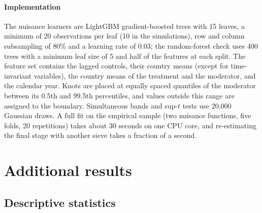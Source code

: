 \documentclass[preprint,12pt,authoryear]{elsarticle}
\begin{document}
\paragraph{Implementation}
The nuisance learners are LightGBM gradient-boosted trees \citep{ke2017lightgbm} with 15 leaves, a minimum of 20 observations per leaf (10 in the simulations), row and column subsampling of 80\% and a learning rate of 0.03; the random-forest check uses 400 trees \citep{breiman2001rf} with a minimum leaf size of 5 and half of the features at each split. The feature set contains the lagged controls, their country means (except for time-invariant variables), the country means of the treatment and the moderator, and the calendar year. Knots are placed at equally spaced quantiles of the moderator between its 0.5th and 99.5th percentiles, and values outside this range are assigned to the boundary. Simultaneous bands and sup-$t$ tests use 20,000 Gaussian draws. A full fit on the empirical sample (two nuisance functions, five folds, 20 repetitions) takes about 30 seconds on one CPU core, and re-estimating the final stage with another sieve takes a fraction of a second.

\section{Additional results}\label{app:tables}


\subsection*{Descriptive statistics}
\end{document}
